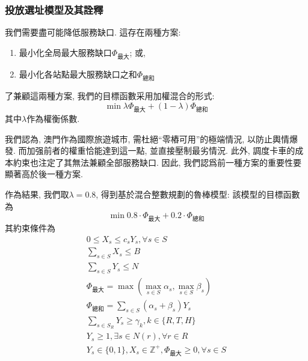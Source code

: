 \subsubsection{投放選址模型及其詮釋}
我們需要盡可能降低服務缺口. 這存在兩種方案: 
\begin{enumerate}
    \item 最小化全局最大服務缺口\(\Phi_\text{最大}\); 或, 
    \item 最小化各站點最大服務缺口之和\(\Phi_\text{總和}\)
\end{enumerate}
了兼顧這兩種方案, 我們的目標函數采用加權混合的形式: 
\begin{equation}
    \min \lambda \Phi_\text{最大} + (1-\lambda)\Phi_\text{總和}
\end{equation}
其中\(\lambda\)作為權衡係數.

我們認為, 澳門作為國際旅遊城市, 需杜絕“零樁可用”的極端情況, 以防止輿情爆發. 而加强前者的權重恰能達到這一點, 並直接壓制最劣情況. 此外, 調度卡車的成本約束也注定了其無法兼顧全部服務缺口. 因此, 我們認爲前一種方案的重要性要顯著高於後一種方案. 

作為結果, 我們取\(\lambda=0.8\), 得到基於混合整數規劃的魯棒模型: 
該模型的目標函數為
\begin{equation}
    \min 0.8 \cdot \Phi_\text{最大} + 0.2\cdot\Phi_\text{總和}
\end{equation}
其約束條件為
\begin{gather}
    0\leqslant X_s \leqslant c_s Y_s, \forall s\in S\\
    \sum_{s\in S}X_s \leqslant B\\
    \sum_{s\in S}Y_s \leqslant N\\
    \Phi_\text{最大} = \max \left(\max_{s\in S}\alpha_s,\max_{s\in S}\beta_s\right)\\
    \Phi_\text{總和}=\sum_{s\in S}(\alpha_s+\beta_s)Y_s\\
    \sum_{s\in S_R}Y_s \geqslant \gamma_k, k\in \{R,T,H\}\\
    Y_s \geqslant 1, \exists s\in N(r), \forall r\in R\\
    Y_s \in \{0,1\}, X_s\in \mathbb{Z}^+ , \Phi_\text{最大}\geqslant 0 ,\forall s\in S
\end{gather}

